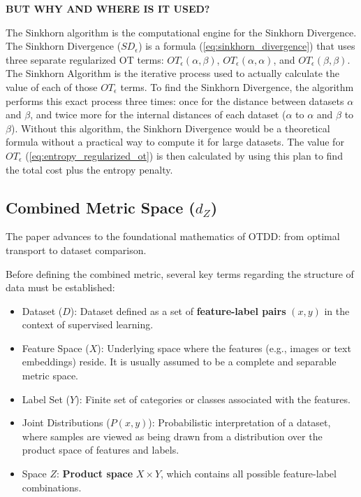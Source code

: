 \documentclass[11pt, a4paper]{article}
\theoremstyle{plain} %
\theoremstyle{definition} %
\begin{document}
					\textbf{BUT WHY AND WHERE IS IT USED?}

					The Sinkhorn algorithm is the computational engine for the Sinkhorn Divergence. The Sinkhorn Divergence ($SD_\epsilon$) is a formula (\cref{eq:sinkhorn_divergence}) that uses three separate regularized OT terms: $OT_\epsilon(\alpha, \beta)$, $OT_\epsilon(\alpha, \alpha)$, and  $OT_\epsilon(\beta, \beta)$. The Sinkhorn Algorithm is the iterative process used to actually calculate the value of each of those $OT_\epsilon$ terms. To find the Sinkhorn Divergence, the algorithm performs this exact process three times: once for the distance between datasets $\alpha$ and $\beta$, and twice more for the internal distances of each dataset ($\alpha$ to $\alpha$ and $\beta$ to $\beta$). Without this algorithm, the Sinkhorn Divergence would be a theoretical formula without a practical way to compute it for large datasets. The value for $OT_\epsilon$ (\cref{eq:entropy_regularized_ot}) is then calculated by using this plan to find the total cost plus the entropy penalty. 


		\subsection{Combined Metric Space ($d_Z$)}
		\label{sec:combined_metric_space}
			The paper advances to the foundational mathematics of OTDD: from optimal transport to dataset comparison.

			Before defining the combined metric, several key terms regarding the structure of data must be established:
			\begin{itemize}
				\item Dataset ($D$): Dataset defined as a set of \textbf{feature-label pairs} $(x, y)$ in the context of supervised learning.
				\item Feature Space ($X$): Underlying space where the features (e.g., images or text embeddings) reside. It is usually assumed to be a complete and separable metric space.
				\item Label Set ($Y$): Finite set of categories or classes associated with the features.
				\item Joint Distributions ($P(x, y)$): Probabilistic interpretation of a dataset, where samples are viewed as being drawn from a distribution over the product space of features and labels.
				\item Space $Z$: \textbf{Product space} $X \times Y$, which contains all possible feature-label combinations.
			\end{itemize}
\end{document}

